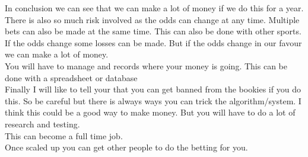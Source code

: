 In conclusion we can see that we can make a lot of money if we do this for a year. There is also so much risk involved as the odds can change at any time. Multiple bets can also be made at the same time. This can also be done with other sports. If the odds change some losses can be made. But if the odds change in our favour we can make a lot of money.\\ You will have to manage and records where your money is going. This can be done with a spreadsheet or database\\
Finally I will like to tell your that you can get banned from the bookies if you do this. So be careful but there is always ways you can trick the algorithm/system.
I think this could be a good way to make money. But you will have to do a lot of research and testing.\\ This can become a full time job.\\ Once scaled up you can get other people to do the betting for you.\\